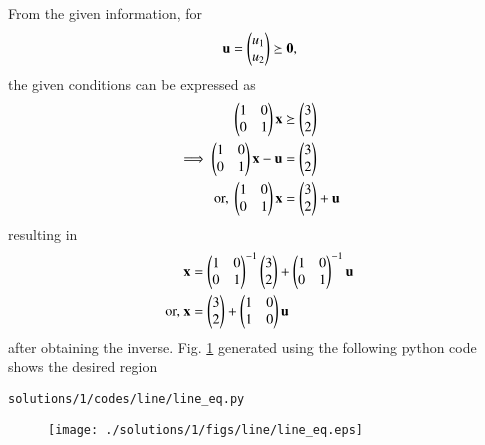From the given information, 
for
\begin{align}
\mathbf{u} = \begin{pmatrix}u_1\\u_2\end{pmatrix}\succeq \mathbf{0},
\end{align}
%
the given conditions can be expressed as
\begin{align}
\begin{pmatrix}1 & 0 \\ 0 & 1\end{pmatrix}\mathbf{x}  &\succeq \begin{pmatrix}3\\2\end{pmatrix}
\\
\implies \begin{pmatrix}1 & 0 \\ 0 & 1\end{pmatrix}\mathbf{x}  -\mathbf{u}&=\begin{pmatrix}3\\2\end{pmatrix}
\\
\text{or, }
\begin{pmatrix}1 & 0 \\ 0 & 1\end{pmatrix}\mathbf{x} &= \begin{pmatrix}3\\2\end{pmatrix} +\mathbf{u}
\end{align}
%
resulting in 
\begin{align}
\mathbf{x} &= \begin{pmatrix}1 & 0 \\ 0 & 1\end{pmatrix}^{-1}\begin{pmatrix}3\\2\end{pmatrix} +\begin{pmatrix}1 & 0 \\ 0 & 1\end{pmatrix}^{-1}\mathbf{u}
\\
\text{or, } \mathbf{x} &= \begin{pmatrix}3\\2\end{pmatrix} +\begin{pmatrix}1 & 0 \\ 1 & 0\end{pmatrix}\mathbf{u}
\end{align}
%
after obtaining the  inverse.
%
 Fig. \ref{fig:3.11.1_line_ineq} generated using the following python code shows the desired region 

\begin{lstlisting}
solutions/1/codes/line/line_eq.py
\end{lstlisting}
%
\begin{figure}[!ht]
\texttt{[image: ./solutions/1/figs/line/line\_eq.eps]}
\caption{}
\label{fig:3.11.1_line_ineq}
\end{figure}
%




